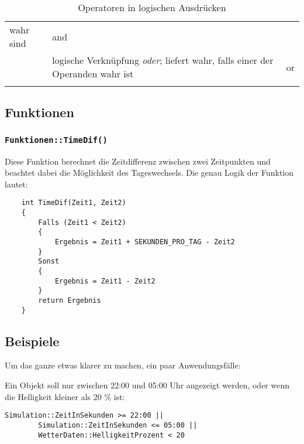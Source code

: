 \begin{longtable}[c]{@{}lll@{}}
\begin{minipage}[t]{0.77\columnwidth}
wahr sind
\end{minipage} & \begin{minipage}[t]{0.15\columnwidth}\raggedright
and
\end{minipage}
\\\noalign{\medskip}
\begin{minipage}[t]{0.08\columnwidth}\raggedright
\textbar{}\textbar{}
\end{minipage} & \begin{minipage}[t]{0.77\columnwidth}\raggedright
logische Verknüpfung \emph{oder}; liefert wahr, falls einer der
Operanden wahr ist
\end{minipage} & \begin{minipage}[t]{0.15\columnwidth}\raggedright
or
\end{minipage}
\\\noalign{\medskip}
\hline
\noalign{\medskip}
\caption{Operatoren in logischen Ausdrücken}
\end{longtable}

\subsection{Funktionen}

\subsubsection{\texttt{Funktionen::TimeDif()}}

Diese Funktion berechnet die Zeitdifferenz zwischen zwei Zeitpunkten und
beachtet dabei die Möglichkeit des Tageswechsels. Die genau Logik der
Funktion lautet:

\begin{lstlisting}
    int TimeDif(Zeit1, Zeit2)
    {
        Falls (Zeit1 < Zeit2)
        {
            Ergebnis = Zeit1 + SEKUNDEN_PRO_TAG - Zeit2
        }
        Sonst
		{
			Ergebnis = Zeit1 - Zeit2
		}
        return Ergebnis
    }       
\end{lstlisting}

\subsection{Beispiele}

Um das ganze etwas klarer zu machen, ein paar Anwendungsfälle:

Ein Objekt soll nur zwischen 22:00 und 05:00 Uhr angezeigt werden, oder
wenn die Helligkeit kleiner als 20 \% ist:

\begin{lstlisting}
Simulation::ZeitInSekunden >= 22:00 ||
        Simulation::ZeitInSekunden <= 05:00 || 
        WetterDaten::HelligkeitProzent < 20
\end{lstlisting}

